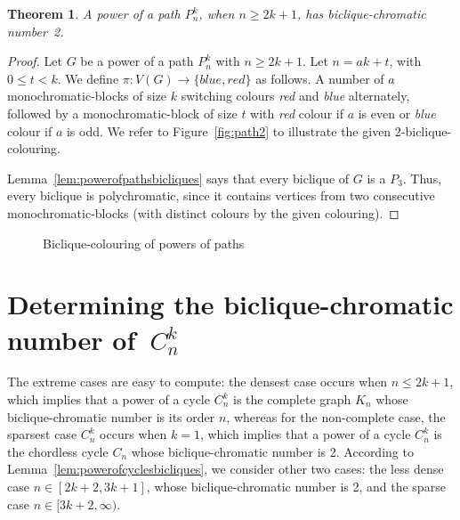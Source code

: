 \documentclass{article}
\newtheorem{theorem}{Theorem}
\begin{document}
\begin{theorem}
\label{thm:kappabpowerofpathsecondinterval}
 A power of a path $P_n^k$, when $n \geq 2k + 1$, has
 biclique-chromatic number~2.
\end{theorem}

\begin{proof}
Let $G$ be a power of a path $P_{n}^{k}$ with $n \geq 2k + 1$. 
Let $n = ak + t$, with $0 \leq t < k$. We define
$\pi:V(G)\rightarrow\{blue,red\}$ as follows. A number of $a$
monochromatic-blocks of size $k$ switching colours \emph{red} and \emph{blue}
alternately, followed by a monochromatic-block of size $t$ with \emph{red}
colour if $a$ is even or \emph{blue} colour if $a$ is odd.
We refer to Figure~\ref{fig:path2} to illustrate the given
2-biclique-colouring.

Lemma~\ref{lem:powerofpathsbicliques} says that every biclique of $G$ is a
$P_{3}$. Thus, every biclique is polychromatic, since it contains vertices from
two consecutive monochromatic-blocks (with distinct colours by the
given colouring).
\end{proof}

\begin{figure}[t]
\centering
	\qquad
	\caption{Biclique-colouring of
	powers of paths}
	\label{fig:pathbicliquecolouring}
\end{figure}


\section{Determining the biclique-chromatic number of~$C_{n}^{k}$}
\label{sec:bicliqueupperboundpowerofcycle}

The extreme cases are easy to compute: the densest case occurs when
$n \leq 2k + 1$, which implies that a power of a cycle $C_n^k$ is the complete
graph $K_n$ whose biclique-chromatic number is its order $n$, whereas for the
non-complete case, the sparsest case $C_n^k$ occurs when $k = 1$, which implies
that a power of a cycle $C_n^k$ is the chordless cycle $C_n$ whose
biclique-chromatic number is 2.
According to Lemma~\ref{lem:powerofcyclesbicliques}, we consider other two
cases:
the less dense case $n \in [2k + 2, 3k + 1]$, whose biclique-chromatic number is
2, and the sparse case $n \in [3k + 2, \infty)$.
\end{document}

